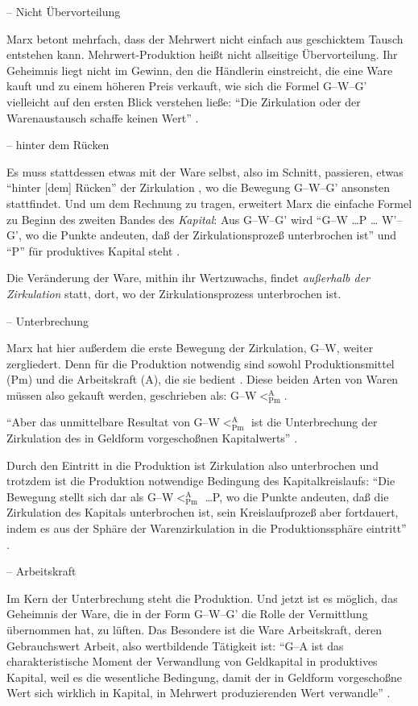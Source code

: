 \documentclass[12pt,
               DIV13,
               paper=a4,
               twoside=false,
               onehalfspacing,
               bibliography=totoc,
               toc=graduated,
               draft,
               ]{scrartcl}
\newcommand{\pc}[2]{\parencite[#1]{#2}}
\newcommand{\vgl}[2]{\parencite[vgl.][#1]{#2}}
\newcommand{\gwg}{G--W--G'\xspace}
\newcommand{\gwapm}{G--W$<^{\text{A}}_{\text{Pm}}$\xspace}
\newcommand{\gwapmp}{G--W$<^{\text{A}}_{\text{Pm}}$ \dots P\xspace}
\begin{document}
-- Nicht Übervorteilung

Marx betont mehrfach, dass der Mehrwert nicht einfach aus geschicktem
Tausch entstehen kann. Mehrwert-Produktion heißt nicht allseitige
Übervorteilung. Ihr Geheimnis liegt nicht im Gewinn, den die Händlerin
einstreicht, die eine Ware kauft und zu einem höheren Preis verkauft,
wie sich die Formel \gwg vielleicht auf den ersten Blick verstehen
ließe: "`Die Zirkulation oder der Warenaustausch schaffe keinen Wert"'
\pc{178}{kap}.

-- hinter dem Rücken

Es muss stattdessen etwas mit der Ware selbst, also im Schnitt, passieren,
etwas "`hinter [dem] Rücken"' der Zirkulation \pc{181}{kap}, wo die
Bewegung \gwg ansonsten stattfindet. Und um dem
Rechnung zu tragen, erweitert Marx die einfache Formel zu Beginn des
zweiten Bandes des \emph{Kapital}: Aus \gwg wird "`G--W \dots P \dots
W'--G', wo die Punkte andeuten, daß der Zirkulationsprozeß
unterbrochen ist"' \pc{31}{kap2} und "`P"' für produktives Kapital
steht \vgl{34}{kap2}.

Die Veränderung der Ware, mithin ihr Wertzuwachs, findet
\emph{außerhalb der Zirkulation} statt, dort, wo der
Zirkulationsprozess unterbrochen ist.

-- Unterbrechung

Marx hat hier außerdem die erste Bewegung der Zirkulation, G--W,
weiter zergliedert. Denn für die Produktion notwendig sind sowohl
Produktionsmittel (Pm) und die Arbeitskraft (A), die sie bedient
\vgl{32}{kap2}. Diese beiden Arten von Waren müssen also gekauft
werden, geschrieben als: \gwapm.

"`Aber das unmittelbare Resultat von \gwapm ist die Unterbrechung der
Zirkulation des in Geldform vorgeschoßnen Kapitalwerts"'
\pc{40}{kap2}.

Durch den Eintritt in die Produktion ist Zirkulation also unterbrochen
und trotzdem ist die Produktion notwendige Bedingung des
Kapitalkreislaufs: "`Die Bewegung stellt sich dar als \gwapmp, wo die Punkte andeuten,
daß die Zirkulation des Kapitals unterbrochen ist, sein
Kreislaufprozeß aber fortdauert, indem es aus der Sphäre der
Warenzirkulation in die Produktionssphäre eintritt"' \pc{40}{kap2}.

-- Arbeitskraft

Im Kern der Unterbrechung steht die Produktion. Und jetzt ist es
möglich, das Geheimnis der Ware, die in der Form \gwg die Rolle der
Vermittlung übernommen hat, zu lüften. Das Besondere ist die Ware
Arbeitskraft, deren Gebrauchswert Arbeit, also wertbildende Tätigkeit
ist: "`G--A ist das charakteristische Moment der Verwandlung von
Geldkapital in produktives Kapital, weil es die wesentliche Bedingung,
damit der in Geldform vorgeschoßne Wert sich wirklich in Kapital, in
Mehrwert produzierenden Wert verwandle"' \pc{35}{kap2}.
\end{document}
